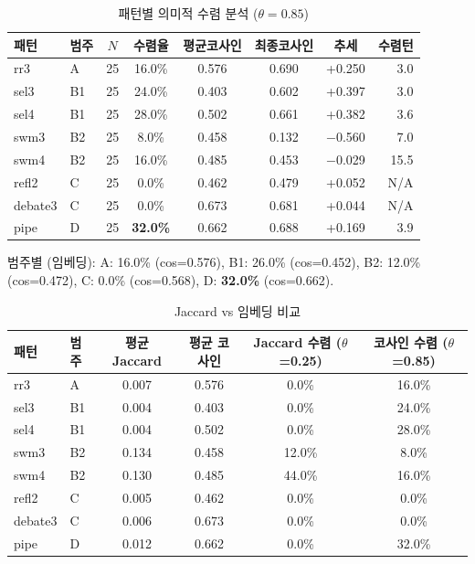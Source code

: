 \begin{table}[H]
\centering
\caption{패턴별 의미적 수렴 분석 ($\theta=0.85$)}
\label{tab:semantic-convergence}
{\small
\begin{tabular}{llcccccr}
\toprule
패턴 & 범주 & $N$ & 수렴율 & 평균코사인 & 최종코사인 & 추세 & 수렴턴 \\
\midrule
rr3     & A  & 25 & 16.0\% & 0.576 & 0.690 & +0.250  & 3.0 \\
sel3    & B1 & 25 & 24.0\% & 0.403 & 0.602 & +0.397  & 3.0 \\
sel4    & B1 & 25 & 28.0\% & 0.502 & 0.661 & +0.382  & 3.6 \\
swm3    & B2 & 25 & 8.0\%  & 0.458 & 0.132 & $-$0.560 & 7.0 \\
swm4    & B2 & 25 & 16.0\% & 0.485 & 0.453 & $-$0.029 & 15.5 \\
refl2   & C  & 25 & 0.0\%  & 0.462 & 0.479 & +0.052  & N/A \\
debate3 & C  & 25 & 0.0\%  & 0.673 & 0.681 & +0.044  & N/A \\
pipe    & D  & 25 & \textbf{32.0\%} & 0.662 & 0.688 & +0.169 & 3.9 \\
\bottomrule
\end{tabular}
}
\end{table}

범주별 (임베딩): A: 16.0\% (cos=0.576), B1: 26.0\% (cos=0.452), B2: 12.0\% (cos=0.472), C: 0.0\% (cos=0.568), D: \textbf{32.0\%} (cos=0.662).

\begin{table}[H]
\centering
\caption{Jaccard vs 임베딩 비교}
\label{tab:jaccard-vs-embedding}
{\footnotesize
\begin{tabular}{llcccc}
\toprule
패턴 & 범주 & 평균 Jaccard & 평균 코사인 & Jaccard 수렴 ($\theta$=0.25) & 코사인 수렴 ($\theta$=0.85) \\
\midrule
rr3     & A  & 0.007 & 0.576 & 0.0\%  & 16.0\% \\
sel3    & B1 & 0.004 & 0.403 & 0.0\%  & 24.0\% \\
sel4    & B1 & 0.004 & 0.502 & 0.0\%  & 28.0\% \\
swm3    & B2 & 0.134 & 0.458 & 12.0\% & 8.0\%  \\
swm4    & B2 & 0.130 & 0.485 & 44.0\% & 16.0\% \\
refl2   & C  & 0.005 & 0.462 & 0.0\%  & 0.0\%  \\
debate3 & C  & 0.006 & 0.673 & 0.0\%  & 0.0\%  \\
pipe    & D  & 0.012 & 0.662 & 0.0\%  & 32.0\% \\
\bottomrule
\end{tabular}
}
\end{table}


